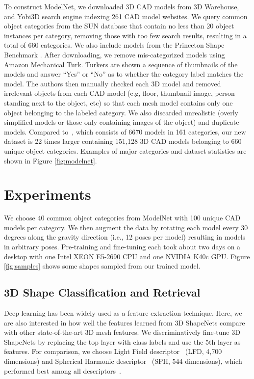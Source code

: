\documentclass[10pt,twocolumn,letterpaper]{article}
\begin{document}
To construct ModelNet, we downloaded 3D CAD models from 3D Warehouse, and Yobi3D search engine indexing 261 CAD model websites. 
We query common object categories from the SUN database \cite{SUNDB}
that contain no less than 20 object instances per category, removing
those with too few search results, resulting in a total of 660 categories. We also include models from the Princeton Shape Benchmark \cite{Psb}.
After downloading, we remove mis-categorized models using Amazon
Mechanical Turk. Turkers are shown a sequence of thumbnails of the
models and answer ``Yes'' or ``No'' as to whether the category label
matches the model. The authors then manually checked each 3D model and
removed irrelevant objects from each CAD model (e.g, floor, thumbnail
image, person standing next to the object, etc) so that each mesh
model contains only one object belonging to the labeled category. We
also discarded unrealistic (overly simplified models or those only containing images of the object) and duplicate models.
Compared to~\cite{Psb}, which consists of 6670 models in 161 categories, our new dataset is 22 times larger containing 151,128 3D CAD models belonging to 660 unique object categories. Examples of major categories and dataset statistics are shown in Figure \ref{fig:modelnet}.






\section{Experiments}
We choose 40 common object categories from ModelNet with 100 unique CAD models per category. We then augment the data by rotating each model every 30 degrees along the gravity direction (i.e., 12 poses per model) resulting in models in arbitrary poses. Pre-training and fine-tuning each took about two days on a desktop with one Intel XEON E5-2690 CPU and one NVIDIA K40c GPU.
Figure \ref{fig:samples} shows some shapes sampled from our trained model.







\subsection{3D Shape Classification and Retrieval}
\label{sec:exp:classification}


Deep learning has been widely used as a feature extraction technique. Here, we are also interested in how well the features learned from 3D ShapeNets compare with other state-of-the-art 3D mesh features. We discriminatively fine-tune 3D ShapeNets by replacing the top layer with class labels and use the 5th layer as features. For comparison, we choose Light Field descriptor~\cite{LFDfeature} (LFD, 4,700 dimensions) and Spherical Harmonic descriptor~\cite{SHPfeature} (SPH, 544 dimensions), which performed best among all descriptors~\cite{Psb}. 
\end{document}
